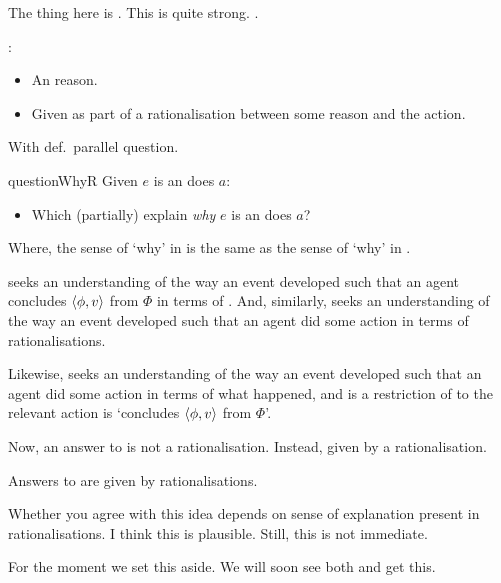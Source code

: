 \begin{note}
{    The thing here is .
    This is quite strong.
    .
  }

  \begin{definition}[\motingr{3}]
    :
    \begin{itemize}
    \item
      An \agents{} reason.
    \item
      Given as part of a rationalisation between some reason and the action.
    \end{itemize}
  \end{definition}

  With def.\ parallel question.

  \begin{question}{questionWhyR}{\qWhyR{}}
    Given \(e\) is an  \vAgent{} does \(a\):

    \begin{itemize}
    \item
      Which  (partially) explain \emph{why} \(e\) is an  \vAgent{} does \(a\)?
    \end{itemize}
    \vspace{-1\baselineskip}
  \end{question}

  Where, the sense of `why' in \qWhyR{} is the same as the sense of `why' in \qWhy{}.
\end{note}


\begin{note}
  \qWhy{} seeks an understanding of the way an event developed such that an agent concludes \(\langle\phi, v\rangle\) from \(\Phi\) in terms of .
  And, similarly, \qWhyR{} seeks an understanding of the way an event developed such that an agent did some action in terms of rationalisations.

  Likewise, \qHowR{} seeks an understanding of the way an event developed such that an agent did some action in terms of what happened, and \qHow{} is a restriction of \qHowR{} to  the relevant action is `concludes \(\langle\phi, v\rangle\) from \(\Phi\)'.
\end{note}


\begin{note}
  Now, an answer to \qWhyR{} is not a rationalisation.
  Instead, given by a rationalisation.

  \begin{idea}
    Answers to \qWhyR{} are given by rationalisations.
  \end{idea}

  Whether you agree with this idea depends on sense of explanation present in rationalisations.
  I think this is plausible.
  Still, this is not immediate.

  For the moment we set this aside.
  We will soon see both \citeauthor{Davidson:1963aa} and \citeauthor{Hieronymi:2011aa} get this.
\end{note}


